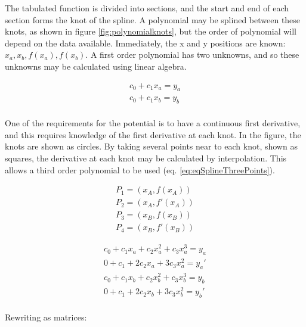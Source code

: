 The tabulated function is divided into sections, and the start and end of each section forms the knot of the spline.  A polynomial may be splined between these knots, as shown in figure \ref{fig:polynomialknots}, but the order of polynomial will depend on the data available.  Immediately, the x and y positions are known: $x_a, x_b, f(x_a), f(x_b)$.  A first order polynomial has two unknowns, and so these unknowns may be calculated using linear algebra.

\begin{equation}
\begin{split}
c_0 + c_1 x_a = y_a \\
c_0 + c_1 x_b = y_b \\
\end{split}
\label{eq:cubicSpline}
\end{equation}

One of the requirements for the potential is to have a continuous first derivative, and this requires knowledge of the first derivative at each knot.  In the figure, the knots are shown as circles.  By taking several points near to each knot, shown as squares, the derivative at each knot may be calculated by interpolation.  This allows a third order polynomial to be used (eq. \ref{eq:eqSplineThreePoints}).

\begin{equation}
\begin{split}
      P_{1} = \left( x_A, f(x_A) \right) \\
      P_{2} = \left( x_A, f'(x_A) \right) \\
      P_{3} = \left( x_B, f(x_B) \right) \\
      P_{4} = \left( x_B, f'(x_B) \right)
\end{split}
\label{eq:eqSplineThreePoints}
\end{equation}

\begin{equation}
\begin{split}
c_0 + c_1 x_a + c_2 x_a^2 + c_3 x_a^3 = y_a \\
0 + c_1 + 2 c_2 x_a + 3 c_3 x_a^2 = y_a' \\
c_0 + c_1 x_b + c_2 x_b^2 + c_3 x_b^3 = y_b \\
0 + c_1 + 2 c_2 x_b + 3 c_3 x_b^2 = y_b' \\
\end{split}
\label{eq:cubicSpline}
\end{equation}

Rewriting as matrices:

